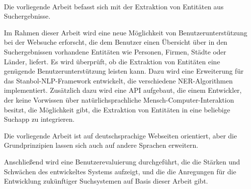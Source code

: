 \paragraph{}
Die vorliegende Arbeit befasst sich mit der Extraktion von Entitäten aus Suchergebnisse.

Im Rahmen dieser Arbeit wird eine neue Möglichkeit von Benutzerunterstützung bei der Websuche erforscht, die dem Benutzer einen Übersicht über in den Suchergebnissen vorhandene Entitäten wie Personen, Firmen, Städte oder Länder, liefert. Es wird überprüft, ob die Extraktion von Entitäten eine genügende Benutzerunterstützung leisten kann. Dazu wird eine Erweiterung für das Stanbol-NLP-Framework entwickelt, die verschiedene NER-Algorithmen implementiert. Zusätzlich dazu wird eine API aufgebaut, die einem Entwickler, der keine Vorwissen über natürlichsprachliche Mensch-Computer-Interaktion besitzt, die Möglichkeit gibt, die Extraktion von Entitäten in eine beliebige Suchapp zu integrieren. 

Die vorliegende Arbeit ist auf deutschsprachige Webseiten orientiert, aber die Grundprinzipien lassen sich auch auf andere Sprachen erweitern.

Anschließend wird eine Benutzerevaluierung durchgeführt, die die Stärken und Schwächen des entwickeltes Systems aufzeigt, und die die Anregungen für die Entwicklung zukünftiger Suchsystemen auf Basis dieser Arbeit gibt.